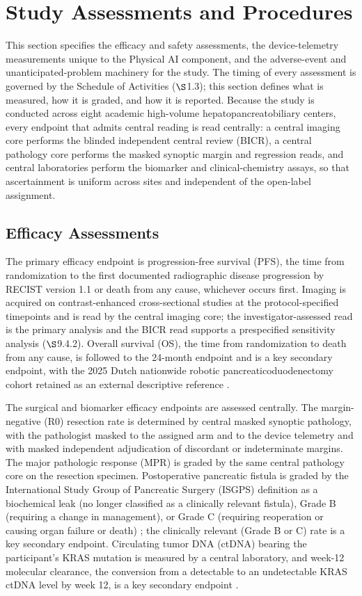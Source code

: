 \section{Study Assessments and Procedures}

This section specifies the efficacy and safety assessments, the device-telemetry
measurements unique to the Physical AI component, and the adverse-event and
unanticipated-problem machinery for the study. The timing of every assessment is
governed by the Schedule of Activities ($\S$1.3); this section defines what is
measured, how it is graded, and how it is reported. Because the study is conducted
across eight academic high-volume hepatopancreatobiliary centers, every endpoint
that admits central reading is read centrally: a central imaging core performs the
blinded independent central review (BICR), a central pathology core performs the
masked synoptic margin and regression reads, and central laboratories perform the
biomarker and clinical-chemistry assays, so that ascertainment is uniform across
sites and independent of the open-label assignment.

\subsection{Efficacy Assessments}

The primary efficacy endpoint is progression-free survival (PFS), the time from
randomization to the first documented radiographic disease progression by RECIST
version 1.1 or death from any cause, whichever occurs first. Imaging is acquired on
contrast-enhanced cross-sectional studies at the protocol-specified timepoints and is
read by the central imaging core; the investigator-assessed read is the primary
analysis and the BICR read supports a prespecified sensitivity analysis ($\S$9.4.2).
Overall survival (OS), the time from randomization to death from any cause, is
followed to the 24-month endpoint and is a key secondary endpoint, with the 2025
Dutch nationwide robotic pancreaticoduodenectomy cohort retained as an external
descriptive reference \cite{DutchCohort2025}.

The surgical and biomarker efficacy endpoints are assessed centrally. The
margin-negative (R0) resection rate is determined by central masked synoptic
pathology, with the pathologist masked to the assigned arm and to the device
telemetry and with masked independent adjudication of discordant or indeterminate
margins. The major pathologic response (MPR) is graded by the same central pathology
core on the resection specimen. Postoperative pancreatic fistula is graded by the
International Study Group of Pancreatic Surgery (ISGPS) definition as a biochemical
leak (no longer classified as a clinically relevant fistula), Grade B (requiring a
change in management), or Grade C (requiring reoperation or causing organ failure or
death) \cite{Bassi2017}; the clinically relevant (Grade B or C) rate is a key
secondary endpoint. Circulating tumor DNA (ctDNA) bearing the participant's KRAS
mutation is measured by a central laboratory, and week-12 molecular clearance, the
conversion from a detectable to an undetectable KRAS ctDNA level by week 12, is a key
secondary endpoint \cite{Tie2019ctdna}.

